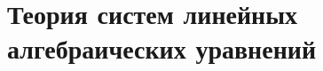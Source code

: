 \documentclass[../main.tex]{subfiles}
\begin{document}
\chapter{Теория систем линейных алгебраических уравнений}

\end{document}
